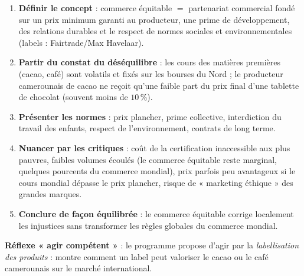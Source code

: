 \documentclass[11pt]{article}
\begin{document}
\begin{methode}
\begin{enumerate}
\item \textbf{Définir le concept} : commerce équitable $=$ partenariat commercial fondé sur un prix minimum garanti au producteur, une prime de développement, des relations durables et le respect de normes sociales et environnementales (labels : Fairtrade/Max Havelaar).
\item \textbf{Partir du constat du déséquilibre} : les cours des matières premières (cacao, café) sont volatils et fixés sur les bourses du Nord ; le producteur camerounais de cacao ne reçoit qu'une faible part du prix final d'une tablette de chocolat (souvent moins de $10\,\%$).
\item \textbf{Présenter les normes} : prix plancher, prime collective, interdiction du travail des enfants, respect de l'environnement, contrats de long terme.
\item \textbf{Nuancer par les critiques} : coût de la certification inaccessible aux plus pauvres, faibles volumes écoulés (le commerce équitable reste marginal, quelques pourcents du commerce mondial), prix parfois peu avantageux si le cours mondial dépasse le prix plancher, risque de « marketing éthique » des grandes marques.
\item \textbf{Conclure de façon équilibrée} : le commerce équitable corrige localement les injustices sans transformer les règles globales du commerce mondial.
\end{enumerate}
\textbf{Réflexe « agir compétent »} : le programme propose d'agir par la \emph{labellisation des produits} : montre comment un label peut valoriser le cacao ou le café camerounais sur le marché international.
\end{methode}
\end{document}
